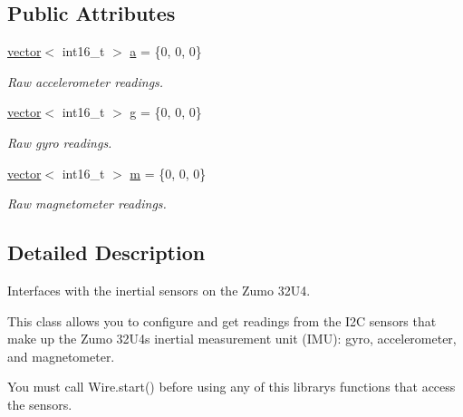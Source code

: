 \subsection*{Public Attributes}
\begin{DoxyCompactItemize}
\item 
\mbox{\label{class_zumo32_u4_i_m_u_a386b34407b744844d403e5e0041dc475}} 
\hyperlink{struct_zumo32_u4_i_m_u_1_1vector}{vector}$<$ int16\+\_\+t $>$ \hyperlink{class_zumo32_u4_i_m_u_a386b34407b744844d403e5e0041dc475}{a} = \{0, 0, 0\}
\begin{DoxyCompactList}\small\item\em Raw accelerometer readings. \end{DoxyCompactList}\item 
\mbox{\label{class_zumo32_u4_i_m_u_a6870acdcde72d4f3ec2bd70088641e4e}} 
\hyperlink{struct_zumo32_u4_i_m_u_1_1vector}{vector}$<$ int16\+\_\+t $>$ \hyperlink{class_zumo32_u4_i_m_u_a6870acdcde72d4f3ec2bd70088641e4e}{g} = \{0, 0, 0\}
\begin{DoxyCompactList}\small\item\em Raw gyro readings. \end{DoxyCompactList}\item 
\mbox{\label{class_zumo32_u4_i_m_u_a667705e0bbee3b4b5ec3a49b2fc72662}} 
\hyperlink{struct_zumo32_u4_i_m_u_1_1vector}{vector}$<$ int16\+\_\+t $>$ \hyperlink{class_zumo32_u4_i_m_u_a667705e0bbee3b4b5ec3a49b2fc72662}{m} = \{0, 0, 0\}
\begin{DoxyCompactList}\small\item\em Raw magnetometer readings. \end{DoxyCompactList}\end{DoxyCompactItemize}


\subsection{Detailed Description}
Interfaces with the inertial sensors on the Zumo 32\+U4. 

This class allows you to configure and get readings from the I2C sensors that make up the Zumo 32\+U4\textquotesingle{}s inertial measurement unit (I\+MU)\+: gyro, accelerometer, and magnetometer.

You must call {\ttfamily Wire.\+start()} before using any of this library\textquotesingle{}s functions that access the sensors. 

